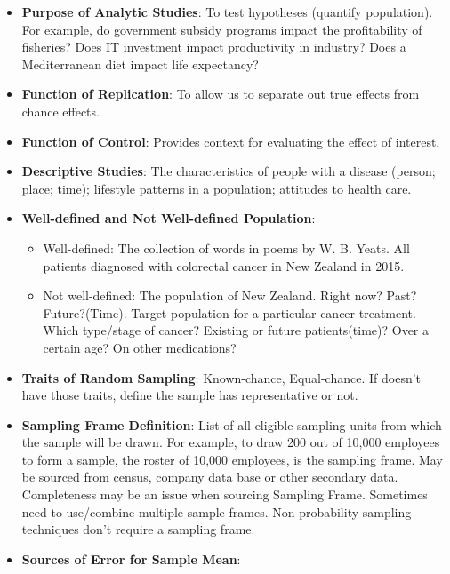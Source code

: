 \documentclass[12pt]{book}
\begin{document}
\begin{itemize}
\item \textbf{Purpose of Analytic Studies}: To test hypotheses (quantify population). For example, do government subsidy programs impact the profitability of fisheries? Does IT investment impact productivity in industry? Does a Mediterranean diet impact life expectancy?
\item \textbf{Function of Replication}: To allow us to separate out true effects from chance effects.
\item \textbf{Function of Control}: Provides context for evaluating the effect of interest.
\item \textbf{Descriptive Studies}: The characteristics of people with a disease (person; place; time); lifestyle patterns in a population; attitudes to health care.
\item \textbf{Well-defined and Not Well-defined Population}:
    \begin{itemize}
    \item Well-defined: The collection of words in poems by W. B. Yeats. All patients diagnosed with colorectal cancer in New Zealand in 2015.
    \item Not well-defined: The population of New Zealand. Right now? Past? Future?(Time). Target population for a particular cancer treatment. Which type/stage of cancer? Existing or future patients(time)? Over a certain age? On other medications?
    \end{itemize}
\item \textbf{Traits of Random Sampling}: Known-chance, Equal-chance. If doesn't have those traits, define the sample has representative or not.
\item \textbf{Sampling Frame Definition}: List of all eligible sampling units from which the sample will be drawn. For example, to draw 200 out of 10,000 employees to form a sample, the roster of 10,000 employees, is the sampling frame. May be sourced from census, company data base or other secondary data. Completeness may be an issue when sourcing Sampling Frame. Sometimes need to use/combine multiple sample frames. Non-probability sampling techniques don't require a sampling frame.
\item \textbf{Sources of Error for Sample Mean}:

\end{itemize}
\end{document}
